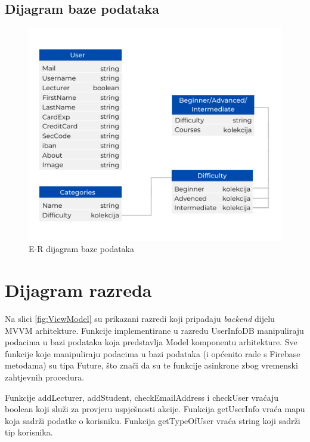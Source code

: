 			\subsection{Dijagram baze podataka}
				\begin{figure}[H]
					\includegraphics[scale=0.6]{dijagrami/ER_baza_podataka.PNG} 
					\centering
					\caption{E-R dijagram baze podataka}
					\label{fig:ER}
				\end{figure} 
			
			\eject
			
			
		\section{Dijagram razreda}
		
			Na slici \ref{fig:ViewModel} su prikazani razredi koji pripadaju \textit{backend} dijelu MVVM arhitekture. Funkcije implementirane u razredu UserInfoDB manipuliraju podacima u bazi podataka koja predstavlja Model komponentu arhitekture. Sve funkcije koje manipuliraju podacima u bazi podataka (i općenito rade s Firebase metodama) su tipa Future, što znači da su te funkcije asinkrone zbog vremenski zahtjevnih procedura.
			
			Funkcije addLecturer, addStudent, checkEmailAddress i checkUser vraćaju boolean koji služi za provjeru uspješnosti akcije. Funkcija getUserInfo vraća mapu koja sadrži podatke o korisniku. Funkcija getTypeOfUser vraća string koji sadrži tip korisnika.
			
